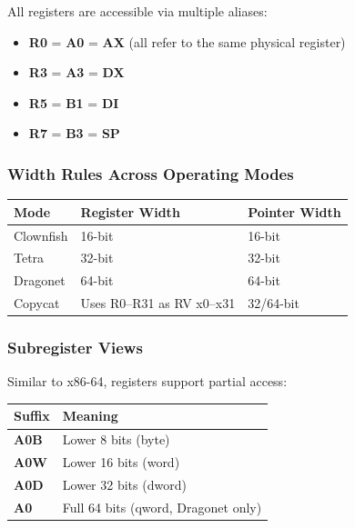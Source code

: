 \documentclass[12pt]{article}
\begin{document}
All registers are accessible via multiple aliases:

\begin{itemize}
    \item \textbf{R0} = \textbf{A0} = \textbf{AX} (all refer to the same physical register)
    \item \textbf{R3} = \textbf{A3} = \textbf{DX}
    \item \textbf{R5} = \textbf{B1} = \textbf{DI}
    \item \textbf{R7} = \textbf{B3} = \textbf{SP}
\end{itemize}

\subsubsection{Width Rules Across Operating Modes}

\begin{table}[h]
\centering
\begin{tabular}{@{}lll@{}}
\toprule
\textbf{Mode} & \textbf{Register Width} & \textbf{Pointer Width} \\ \midrule
Clownfish & 16-bit & 16-bit \\
Tetra & 32-bit & 32-bit \\
Dragonet & 64-bit & 64-bit \\
Copycat & Uses R0--R31 as RV x0--x31 & 32/64-bit \\ \bottomrule
\end{tabular}
\end{table}

\subsubsection{Subregister Views}

Similar to x86-64, registers support partial access:

\begin{table}[h]
\centering
\begin{tabular}{@{}ll@{}}
\toprule
\textbf{Suffix} & \textbf{Meaning} \\ \midrule
\textbf{A0B} & Lower 8 bits (byte) \\
\textbf{A0W} & Lower 16 bits (word) \\
\textbf{A0D} & Lower 32 bits (dword) \\
\textbf{A0} & Full 64 bits (qword, Dragonet only) \\ \bottomrule
\end{tabular}
\end{table}
\end{document}
